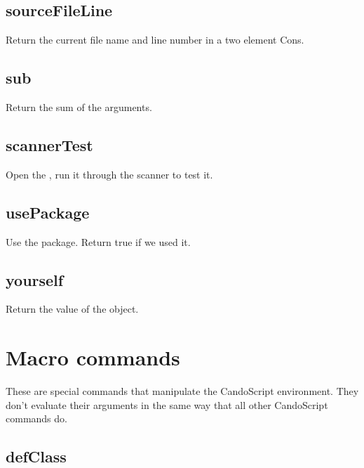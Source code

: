 \begin{itemize}
\subsection{sourceFileLine}

  Return the current file name and line number in a two element Cons.

\subsection{sub}
  \par

  Return the sum of the arguments.

\subsection{scannerTest}

  Open the , run it through the scanner to test it.

\subsection{usePackage}

  Use the package. Return true if we used it.

\subsection{yourself}

  Return the value of the object.

\section{Macro commands}
These are special commands that manipulate the CandoScript environment.
They don't evaluate their arguments in the same way that all other CandoScript commands do.

\subsection{defClass}
  \par


\end{itemize}
